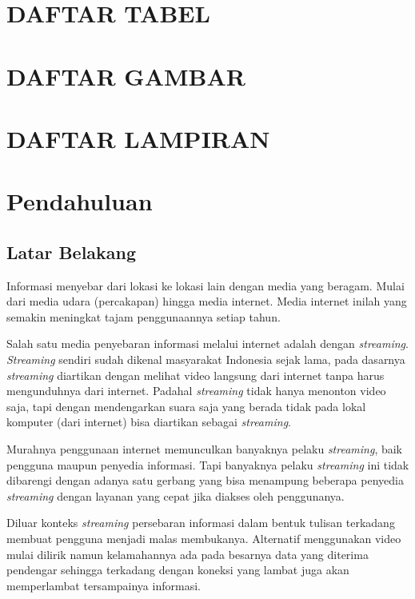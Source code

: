 \documentclass[oneside]{book}
\begin{document}
	\chapter{DAFTAR TABEL}
	

	\chapter{DAFTAR GAMBAR}
	

	\chapter{DAFTAR LAMPIRAN}
	
	\mainmatter

	\chapter{Pendahuluan}
	
	\section{Latar Belakang}
	
	Informasi menyebar dari lokasi ke lokasi lain dengan media yang beragam. Mulai dari media udara (percakapan) hingga media internet. Media internet inilah yang semakin meningkat tajam penggunaannya setiap tahun.
	
	Salah satu media penyebaran informasi melalui internet adalah dengan \textit{streaming}. \textit{Streaming} sendiri sudah dikenal masyarakat Indonesia sejak lama, pada dasarnya \textit{streaming} diartikan dengan melihat video langsung dari internet tanpa harus mengunduhnya dari internet. Padahal \textit{streaming} tidak hanya menonton video saja, tapi dengan mendengarkan suara saja yang berada tidak pada lokal komputer (dari internet) bisa diartikan sebagai \textit{streaming}.
	
	Murahnya penggunaan internet memunculkan banyaknya pelaku \textit{streaming}, baik pengguna maupun penyedia informasi. Tapi banyaknya pelaku \textit{streaming} ini tidak dibarengi dengan adanya satu gerbang yang bisa menampung beberapa penyedia \textit{streaming} dengan layanan yang cepat jika diakses oleh penggunanya.
	
	Diluar konteks \textit{streaming} persebaran informasi dalam bentuk tulisan terkadang membuat pengguna menjadi malas membukanya. Alternatif menggunakan video mulai dilirik namun kelamahannya ada pada besarnya data yang diterima pendengar sehingga terkadang dengan koneksi yang lambat juga akan memperlambat tersampainya informasi.
	
\end{document}
